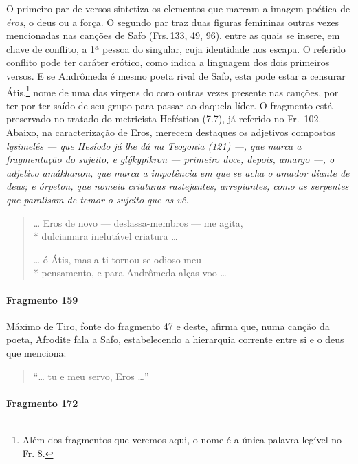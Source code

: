 {\small O primeiro par de versos sintetiza os elementos que marcam a imagem poética de
\textit{éros}, o deus ou a força. O segundo par traz duas figuras femininas
outras vezes mencionadas nas canções de Safo (Frs.\,133, 49, 96), entre
as quais se insere, em chave de conflito, a 1ª pessoa do singular, cuja
identidade nos escapa. O referido conflito pode ter caráter
erótico, como indica a linguagem dos dois primeiros versos. E se Andrômeda é mesmo poeta rival de Safo, esta pode estar a censurar Átis,\footnote{Além dos fragmentos que veremos aqui, o nome é a única palavra legível no Fr. 8.} nome de uma das virgens do coro outras vezes presente nas canções, por ter
por ter saído de seu grupo para passar ao daquela líder. O fragmento está preservado no tratado do metricista Heféstion (7.7), já
referido no Fr.~102.
Abaixo, na caracterização de Eros, merecem destaques os adjetivos  compostos \textit{lysimelḗs  --- que Hesíodo já lhe dá na \textit{Teogonia} (121) ---, que marca a fragmentação do sujeito, e \textit{glýkypikron} --- primeiro doce, depois, amargo ---, o adjetivo \textit{amákhanon}, que marca a impotência em que se acha o amador diante de deus; e \textit{órpeton}, que nomeia criaturas rastejantes, arrepiantes, como as serpentes que paralisam de temor o sujeito que as vê.}

\begin{verse}
\ldots{} Eros de novo --- deslassa-membros --- me agita,\\*
dulciamara inelutável criatura \ldots{}

\ast\quad\ast\quad\ast

\ldots{} ó Átis, mas a ti tornou-se odioso meu\\*
pensamento, e para Andrômeda alças voo \ldots{}
\end{verse}

\paragraph{Fragmento 159}

{\small Máximo de Tiro, fonte do fragmento 47 e deste, afirma que, numa canção da poeta,
Afrodite fala a Safo, estabelecendo a hierarquia corrente entre si e o deus que
menciona:}

\begin{verse}
“\ldots{} tu e meu servo, Eros \ldots{}”
\end{verse}


\paragraph{Fragmento 172}

}
